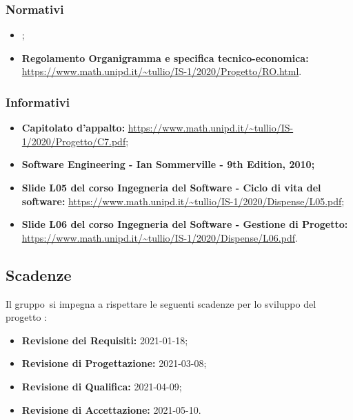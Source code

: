 \subsubsection{Normativi}
\begin{itemize}
\item \NdP{};
\item \textbf{Regolamento Organigramma e specifica tecnico-economica:} \url{https://www.math.unipd.it/~tullio/IS-1/2020/Progetto/RO.html}.
\end{itemize}

\subsubsection{Informativi}
\begin{itemize}
\item \textbf{Capitolato d'appalto:} \url{https://www.math.unipd.it/~tullio/IS-1/2020/Progetto/C7.pdf};
\item\textbf{Software Engineering - Ian Sommerville - 9th Edition, 2010;}
\item \textbf{Slide L05 del corso Ingegneria del Software - Ciclo di vita del software:} \url{https://www.math.unipd.it/~tullio/IS-1/2020/Dispense/L05.pdf};
\item \textbf{Slide L06 del corso Ingegneria del Software - Gestione di Progetto:} \url{https://www.math.unipd.it/~tullio/IS-1/2020/Dispense/L06.pdf}.
\end{itemize}

\subsection{Scadenze}
Il gruppo \Gruppo \,si impegna a rispettare le seguenti scadenze per lo sviluppo del progetto \NomeProgetto:
\begin{itemize}
\item \textbf{Revisione dei Requisiti:} 2021-01-18;
\item \textbf{Revisione di Progettazione:} 2021-03-08;
\item \textbf{Revisione di Qualifica:} 2021-04-09;
\item \textbf{Revisione di Accettazione:} 2021-05-10.
\end{itemize}